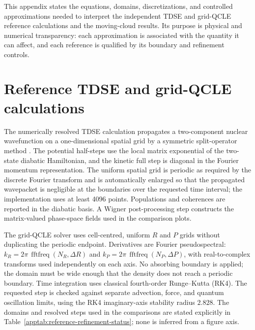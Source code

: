 \documentclass[
  11pt,
  letterpaper,
  onehalfspacing,
  normalmargins,
  equalmargins,
  oneside
]{ut-thesis}
\begin{document}
This appendix states the equations, domains, discretizations, and controlled
approximations needed to interpret the independent TDSE and grid-QCLE
reference calculations and the moving-cloud results. Its purpose is physical
and numerical transparency: each approximation is associated with the
quantity it can affect, and each reference is qualified by its boundary and
refinement controls.

\section{Reference TDSE and grid-QCLE calculations}
\label{appsec:reference-calculations}

The numerically resolved TDSE calculation propagates a two-component nuclear
wavefunction on a one-dimensional spatial grid by a symmetric split-operator
method \cite{FeitFleckSteiger1982,Strang1968}. The potential half-steps use the
local matrix exponential of the two-state diabatic Hamiltonian, and the
kinetic full step is diagonal in the Fourier momentum representation. The
uniform spatial grid is periodic as required by the discrete Fourier
transform and is automatically enlarged so that the propagated wavepacket is
negligible at the boundaries over the requested time interval; the
implementation uses at least 4096 points. Populations and coherences are
reported in the diabatic basis. A Wigner post-processing step constructs the
matrix-valued phase-space fields used in the comparison plots.

The grid-QCLE solver uses cell-centred, uniform \(R\) and \(P\) grids without
duplicating the periodic endpoint. Derivatives are Fourier pseudospectral:
\(k_R=2\pi\,\operatorname{fftfreq}(N_R,\Delta R)\) and
\(k_P=2\pi\,\operatorname{fftfreq}(N_P,\Delta P)\), with real-to-complex
transforms used independently on each axis. No absorbing boundary is applied;
the domain must be wide enough that the density does not reach a periodic
boundary. Time integration uses classical fourth-order Runge--Kutta (RK4).
The requested step is checked against separate advection, force, and quantum
oscillation limits, using the RK4 imaginary-axis stability radius \(2.828\).
The domains and resolved steps used in the comparisons are stated explicitly
in Table~\ref{apptab:reference-refinement-status}; none is inferred from a
figure axis.
\end{document}

